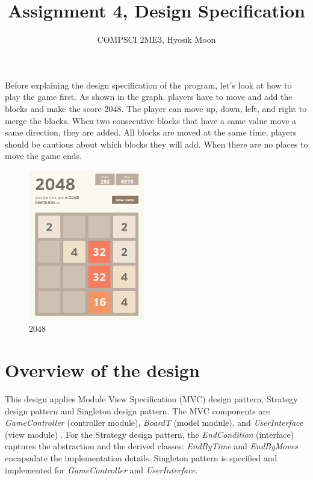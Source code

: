 \documentclass[12pt]{article}
\title{Assignment 4, Design Specification}
\author{COMPSCI 2ME3, Hyosik Moon}
\begin{document}
\maketitle
Before explaining the design specification of the program, let's look at how to play the game first. As shown in the graph, players have to move and add the blocks and make the score 2048. The player can move up, down, left, and right to merge the blocks. When two consecutive blocks that have a same value move a same direction, they are added. All blocks are moved at the same time, players should be cautious about which blocks they will add. When there are no places to move the game ends. 

\begin{figure}[hbt!]
  \centering
  \includegraphics[width=0.45\textwidth]{Figures/2048.png}
  \caption{2048 \cite{2048}}
\end{figure}

\newpage

\section{Overview of the design}

This design applies Module View Specification (MVC) design pattern, Strategy design pattern and Singleton design pattern. The MVC components are \textit{GameController} (controller module), \textit{BoardT} (model module), and \textit{UserInterface} (view module) \cite{Bill}. For the Strategy design pattern, the \textit{EndCondition} (interface) captures the abstraction and the derived classes: \textit{EndByTime} and \textit{EndByMoves} encapsulate the implementation details. Singleton pattern is specified and implemented for \textit{GameController} and \textit{UserInterface}. 
\end{document}
